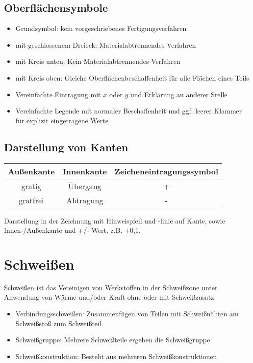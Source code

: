 \documentclass[a4paper,DIV=15,fontsize=11pt]{scrartcl}
\begin{document}
\subsection{Oberflächensymbole}
\begin{itemize}
	\item Grundsymbol: kein vorgeschriebenes Fertigungsverfahren
	\item mit geschlossenem Dreieck: Materialabtrennendes Verfahren
	\item mit Kreis unten: Kein Materialabtrennendes Verfahren
	\item mit Kreis oben: Gleiche Oberflächenbeschaffenheit für alle Flächen eines Teils
	\item Vereinfachte Eintragung mit $x$ oder $y$ und Erklärung an anderer Stelle
	\item Vereinfachte Legende mit normaler Beschaffenheit und ggf. leerer Klammer für explizit eingetragene Werte
\end{itemize}
	
\subsection{Darstellung von Kanten}
\begin{tabular}{|c|c|c|}
	\hline
	Außenkante & Innenkante & Zeicheneintragungssymbol \\
	\hline
	gratig      & Übergang  & +                        \\
	\hline
	gratfrei    & Abtragung  & -                        \\
	\hline 
\end{tabular}

Darstellung in der Zeichnung mit Hinweispfeil und -linie auf Kante, sowie Innen-/Außenkante und +/- Wert, z.B. +0,1.
	
\section{Schweißen}
Schweißen ist das Vereinigen von Werkstoffen in der Schweißzone unter
Anwendung von Wärme und/oder Kraft ohne oder mit Schweißzusatz.
\begin{itemize}
	\item Verbindungsschweißen: Zusammenfügen von Teilen mit Schweißnähten am Schweißstoß zum Schweißteil
	\item Schweißgruppe: Mehrere Schweißteile ergeben die Schweißgruppe
	\item Schweißkonstruktion: Besteht aus mehreren Schweißkonstruktionen
\end{itemize}
\end{document}
